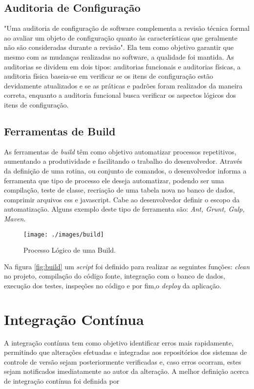 \subsection{Auditoria de Configuração}
"Uma auditoria de configuração de software complementa a revisão técnica formal ao avaliar um objeto de configuração quanto às características que geralmente não são consideradas durante a revisão"\space{}. Ela tem como objetivo garantir que mesmo com as mudanças realizadas no software, a qualidade foi mantida. As auditorias se dividem em dois tipos: auditorias funcionais e auditorias físicas, a auditoria física baseia-se em verificar se os itens de configuração estão devidamente atualizados e se as práticas e padrões foram realizados da maneira correta, enquanto a auditoria funcional busca verificar os aspectos lógicos dos itens de configuração.
\subsection{Ferramentas de Build}
As ferramentas de \textit{build} têm como objetivo automatizar processos repetitivos, aumentando a produtividade e facilitando o trabalho do desenvolvedor. Através da definição de uma rotina, ou conjunto de comandos, o desenvolvedor informa a ferramenta que tipo de processo ele deseja automatizar, podendo ser uma compilação, teste de classe, recriação de uma tabela nova no banco de dados, comprimir arquivos css e javascript. Cabe ao desenvolvedor definir o escopo da automatização. Alguns exemplo deste tipo de ferramenta são: \textit{Ant, Grunt, Gulp, Maven}.


\begin{figure}[H]
\centering
\caption[Processo Lógico de uma Build]{Processo Lógico de uma Build.}
\texttt{[image: ./images/build]}
\label{fig:build}
\end{figure}
Na figura \autoref{fig:build} um \textit{script} foi definido para realizar as seguintes funções: \textit{clean} no projeto, compilação do código fonte, integração com o banco de dados, execução dos testes, inspeções no código e por fim,o \textit{deploy} da aplicação.



\section{Integração Contínua}\label{integracaocont}
\begin{OnehalfSpace}
A integração contínua tem como objetivo identificar erros mais rapidamente, permitindo que alterações efetuadas e integradas aos repositórios dos sistemas de controle de versão sejam posteriormente verificadas e, caso erros ocorram, estes sejam notificados imediatamente ao autor da alteração.
A melhor definição acerca de integração contínua foi definida por 
\end{OnehalfSpace}

